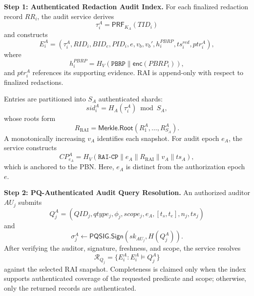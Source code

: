 \documentclass[lettersize,journal]{IEEEtran}
\begin{document}
\medskip
\noindent\textbf{Step 1: Authenticated Redaction Audit Index.}
For each finalized redaction record $RR_i$, the audit service derives
\begin{equation}
\tau_i^A=\mathsf{PRF}_{K_A}(TID_i)
\end{equation}
and constructs
\begin{equation}
E_i^A=
(\tau_i^A,RID_i,BID_e,PID_i,e,v_b,v_b',
h_i^{PBRP},ts_i^{red},ptr_i^A),
\end{equation}
where
\begin{equation}
h_i^{PBRP}
=
H_V(\texttt{PBRP}\parallel\mathsf{enc}(PBRP_i)),
\end{equation}
and $ptr_i^A$ references its supporting evidence. RAI is append-only
with respect to finalized redactions.

Entries are partitioned into $S_A$ authenticated shards:
\begin{equation}
sid_i^A=H_A(\tau_i^A)\bmod S_A,
\end{equation}
whose roots form
\begin{equation}
R_{\mathrm{RAI}}
=
\mathsf{Merkle.Root}(R_1^A,\ldots,R_{S_A}^A).
\end{equation}
A monotonically increasing $v_A$ identifies each snapshot. For audit
epoch $e_A$, the service constructs
\begin{equation}
CP_{e_A}^A
=
H_V(
\texttt{RAI-CP}\parallel e_A\parallel
R_{\mathrm{RAI}}\parallel v_A\parallel ts_A),
\end{equation}
which is anchored to the PBN. Here, $e_A$ is distinct from the
authorization epoch $e$.

\medskip
\noindent\textbf{Step 2: PQ-Authenticated Audit Query Resolution.}
An authorized auditor $AU_j$ submits
\begin{equation}
Q_j^A=
(QID_j,qtype_j,\phi_j,scope_j,e_A,[t_s,t_e],n_j,ts_j)
\end{equation}
and
\begin{equation}
\sigma_j^A
\leftarrow
\mathsf{PQSIG.Sign}(sk_{AU_j},H(Q_j^A)).
\end{equation}
After verifying the auditor, signature, freshness, and scope, the
service resolves
\begin{equation}
\mathcal{R}_{Q_j}
=
\{E_i^A:E_i^A\models Q_j^A\}
\end{equation}
against the selected RAI snapshot. Completeness is claimed only when
the index supports authenticated coverage of the requested predicate
and scope; otherwise, only the returned records are authenticated.
\end{document}
